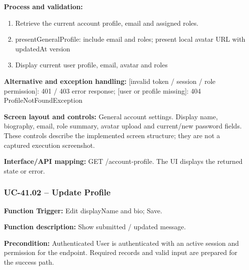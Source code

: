 \textbf{Process and validation:}
\begin{enumerate}
\item Retrieve the current account profile, email and assigned roles.
\item present\allowbreak{}General\allowbreak{}Profile: include email and roles; present local avatar URL with updated\allowbreak{}At version
\item Display current user profile, email, avatar and roles
\end{enumerate}
\textbf{Alternative and exception handling:} [invalid token /\allowbreak{} session /\allowbreak{} role permission]: 401 /\allowbreak{} 403 error response; [user or profile missing]: 404 Profile\allowbreak{}Not\allowbreak{}Found\allowbreak{}Exception

\textbf{Screen layout and controls:} General account settings. Display name, biography, email, role summary, avatar upload and current/\allowbreak{}new password fields. These controls describe the implemented screen structure; they are not a captured execution screenshot.

\textbf{Interface/\allowbreak{}API mapping:} GET /\allowbreak{}account-profile. The UI displays the returned state or error.

\subsubsection{UC-41.02 -- Update Profile}
\textbf{Function Trigger:} Edit display\allowbreak{}Name and bio; Save.

\textbf{Function description:} Show submitted /\allowbreak{} updated message.

\textbf{Precondition:} Authenticated User is authenticated with an active session and permission for the endpoint. Required records and valid input are prepared for the success path.

